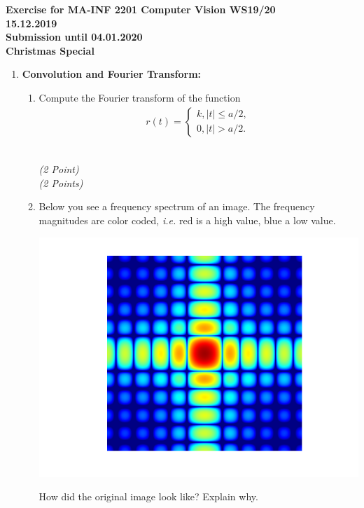 \documentclass[11pt]{article}
\makeatletter
\newcommand{\points}[1]{
    \ifthenelse{\equal{#1}{1}}
        {\\ \emph{(#1 Point)}}
        {\\ \emph{(#1 Points)}}
}
\def\ie{\emph{i.e.}\@\xspace}
\makeatother
\begin{document}
\begin{center}
\textbf{Exercise for MA-INF 2201 Computer Vision WS19/20\\
15.12.2019\\
Submission until 04.01.2020\\
Christmas Special}\\
\end{center}

\vspace{1cm}

\begin{enumerate}
    \item \textbf{Convolution and Fourier Transform:}
    \begin{enumerate}
        \item Compute the Fourier transform of the function
              \begin{align*}
                  r(t) = \begin{cases} k, |t| \leq a/2, \\ 0, |t| > a/2. \end{cases}
              \end{align*}
        \points{2}
        \item Below you see a frequency spectrum of an image. The frequency magnitudes are color coded, \ie red is a high value, blue a low value.
              \begin{center}
                  \includegraphics[scale=0.5]{img/fourier1.png}
              \end{center}
              How did the original image look like? Explain why.

\end{enumerate}
\end{enumerate}
\end{document}
